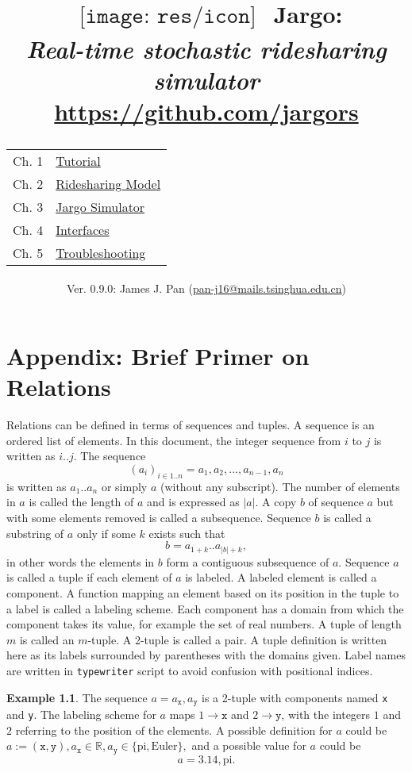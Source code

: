 \documentclass{report}
\title{
  $
  \begin{array}{l}
  \texttt{[image: res/icon]}
  \end{array}
  $
  Jargo:\\
  \large{\textbf{\textit{Real-time stochastic ridesharing simulator}}}\\
  \vspace{0.25em}
  \small{\url{https://github.com/jargors}}\\
  \vspace{2em}
  {
    \small
    \begin{tabular}{lp{.6\textwidth}}
    \toprule
    Ch. 1 &\hyperref[ch-tutorial]{Tutorial}\\
    Ch. 2 &\hyperref[ch-model]{Ridesharing Model}\\
    Ch. 3 &\hyperref[ch-simulator]{Jargo Simulator}\\
    Ch. 4 &\hyperref[ch-interfaces]{Interfaces}\\
    Ch. 5 &\hyperref[ch-troubleshooting]{Troubleshooting}\\
    \bottomrule
    \end{tabular}
  }
}
\author{
  \small{Ver. 0.9.0: James J. Pan (\href{mailto:pan-j16@mails.tsinghua.edu.cn}{pan-j16@mails.tsinghua.edu.cn})}
}
\theoremstyle{definition}                   %
\newtheorem{example}{Example}
\begin{document}
\maketitle
\pagestyle{noweb}

\renewcommand{\thepage}{\roman{page}}
\setcounter{page}{1}

\tableofcontents




\appendix

\chapter{Appendix: Brief Primer on Relations}
\label{ap-primer}

Relations can be defined in terms of sequences and tuples.  A sequence is an
ordered list of elements.  In this document, the integer sequence from $i$ to
$j$ is written as $i..j$. The sequence $$(a_i)_{i\in
1..n}=a_1,a_2,...,a_{n-1},a_n$$ is written as $a_1..a_n$ or simply $a$ (without
any subscript). The number of elements in $a$ is called the length of $a$ and
is expressed as $|a|$.  A copy $b$ of sequence $a$ but with some elements
removed is called a subsequence.  Sequence $b$ is called a substring of $a$
only if some $k$ exists such that $$b=a_{1+k}..a_{|b|+k},$$ in other words the
elements in $b$ form a contiguous subsequence of $a$.  Sequence $a$ is called a
tuple if each element of $a$ is labeled. A labeled element is called a
component.  A function mapping an element based on its position in the tuple to
a label is called a labeling scheme.  Each component has a domain from which
the component takes its value, for example the set of real numbers.  A tuple of
length $m$ is called an $m$-tuple. A 2-tuple is called a pair.  A tuple
definition is written here as its labels surrounded by parentheses with the
domains given. Label names are written in \texttt{typewriter} script to avoid
confusion with positional indices.

\begin{example}
\label{ex:tuple}
The sequence $a=a_\texttt{x},a_\texttt{y}$ is a 2-tuple with components named
\texttt{x} and \texttt{y}.  The labeling scheme for $a$ maps $1\rightarrow
\texttt{x}$ and $2\rightarrow \texttt{y}$, with the integers $1$ and $2$
referring to the position of the elements. A possible definition for $a$ could
be $a:=(\texttt{x},\texttt{y}), a_\texttt{x}\in\mathbb{R},
a_\texttt{y}\in\{\textrm{pi},\textrm{Euler}\},$ and a possible value for $a$
could be $$a=3.14,\textrm{pi}.$$
\end{example}
\end{document}
